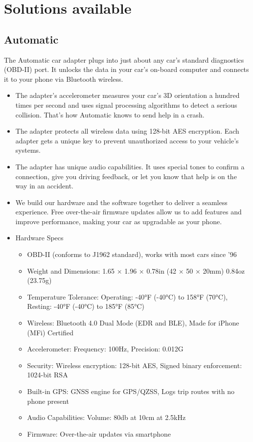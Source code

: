 \section{Solutions available}
\subsection{Automatic}
The Automatic car adapter plugs into just about any car’s standard diagnostics (OBD-II) port. It unlocks the data in your car’s on-board computer and connects it to your phone via Bluetooth wireless.\\
\begin{itemize}
\item The adapter’s accelerometer measures your car’s 3D orientation a hundred times per second and uses signal processing algorithms to detect a serious collision. That’s how Automatic knows to send help in a crash. 
\item The adapter protects all wireless data using 128-bit AES encryption. Each adapter gets a unique key to prevent unauthorized access to your vehicle’s systems.
\item The adapter has unique audio capabilities. It uses special tones to confirm a connection, give you driving feedback, or let you know that help is on the way in an accident.
\item We build our hardware and the software together to deliver a seamless experience. Free over-the-air firmware updates allow us to add features and improve performance, making your car as upgradable as your phone.
\item Hardware Specs\\
\begin{itemize}
\item OBD-II (conforms to J1962 standard), works with most cars since ’96
\item Weight and Dimensions: 1.65 × 1.96 × 0.78in (42 × 50 × 20mm) 0.84oz (23.75g)
\item Temperature Tolerance: Operating: -40°F (-40°C) to 158°F (70°C), Resting: -40°F (-40°C) to 185°F (85°C)
\item Wireless: Bluetooth 4.0 Dual Mode (EDR and BLE), Made for iPhone (MFi) Certified
\item Accelerometer: Frequency: 100Hz, Precision: 0.012G
\item Security: Wireless encryption: 128-bit AES, Signed binary enforcement: 1024-bit RSA
\item Built-in GPS: GNSS engine for GPS/QZSS, Logs trip routes with no phone present
\item Audio Capabilities: Volume: 80db at 10cm at 2.5kHz
\item Firmware: Over-the-air updates via smartphone
\end{itemize}
\end{itemize}

